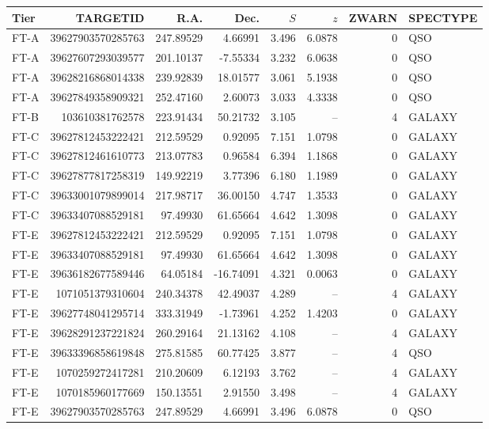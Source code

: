 \begin{ruledtabular}
\begin{tabular}{l r r r r r r l}
Tier & TARGETID & R.A. & Dec. & $S$ & $z$ & ZWARN & SPECTYPE \\
\hline
FT-A & 39627903570285763 & 247.89529 & 4.66991 & 3.496 & 6.0878 & 0 & QSO \\
FT-A & 39627607293039577 & 201.10137 & -7.55334 & 3.232 & 6.0638 & 0 & QSO \\
FT-A & 39628216868014338 & 239.92839 & 18.01577 & 3.061 & 5.1938 & 0 & QSO \\
FT-A & 39627849358909321 & 252.47160 & 2.60073 & 3.033 & 4.3338 & 0 & QSO \\
FT-B & 103610381762578 & 223.91434 & 50.21732 & 3.105 & -- & 4 & GALAXY \\
FT-C & 39627812453222421 & 212.59529 & 0.92095 & 7.151 & 1.0798 & 0 & GALAXY \\
FT-C & 39627812461610773 & 213.07783 & 0.96584 & 6.394 & 1.1868 & 0 & GALAXY \\
FT-C & 39627877817258319 & 149.92219 & 3.77396 & 6.180 & 1.1989 & 0 & GALAXY \\
FT-C & 39633001079899014 & 217.98717 & 36.00150 & 4.747 & 1.3533 & 0 & GALAXY \\
FT-C & 39633407088529181 & 97.49930 & 61.65664 & 4.642 & 1.3098 & 0 & GALAXY \\
FT-E & 39627812453222421 & 212.59529 & 0.92095 & 7.151 & 1.0798 & 0 & GALAXY \\
FT-E & 39633407088529181 & 97.49930 & 61.65664 & 4.642 & 1.3098 & 0 & GALAXY \\
FT-E & 39636182677589446 & 64.05184 & -16.74091 & 4.321 & 0.0063 & 0 & GALAXY \\
FT-E & 1071051379310604 & 240.34378 & 42.49037 & 4.289 & -- & 4 & GALAXY \\
FT-E & 39627748041295714 & 333.31949 & -1.73961 & 4.252 & 1.4203 & 0 & GALAXY \\
FT-E & 39628291237221824 & 260.29164 & 21.13162 & 4.108 & -- & 4 & GALAXY \\
FT-E & 39633396858619848 & 275.81585 & 60.77425 & 3.877 & -- & 4 & QSO \\
FT-E & 1070259272417281 & 210.20609 & 6.12193 & 3.762 & -- & 4 & GALAXY \\
FT-E & 1070185960177669 & 150.13551 & 2.91550 & 3.498 & -- & 4 & GALAXY \\
FT-E & 39627903570285763 & 247.89529 & 4.66991 & 3.496 & 6.0878 & 0 & QSO \\

\end{tabular}
\end{ruledtabular}

